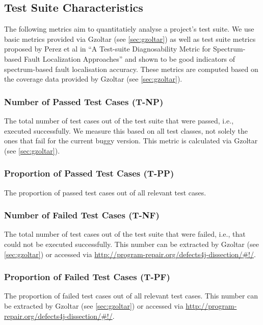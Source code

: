\subsection{Test Suite Characteristics}

The following metrics aim to quantitatiely analyse a project's test suite. We
use basic metrics provided via Gzoltar (see \ref{sec:gzoltar}) as well as test
suite metrics proposed by Perez et al in \enquote{A Test-suite Diagnosability
Metric for Spectrum-based Fault Localization Approaches} and shown to be good
indicators of spectrum-based fault localisation accuracy. These metrics are
computed based on the coverage data provided by Gzoltar (see \ref{sec:gzoltar}).

\subsubsection{Number of Passed Test Cases (T-NP)}

The total number of test cases out of the test suite that were passed, i.e.,
executed successfully. We measure this based on all test classes, not solely
the ones that fail for the current buggy version. This metric is calculated via
Gzoltar (see \ref{sec:gzoltar}).

\subsubsection{Proportion of Passed Test Cases (T-PP)}

The proportion of passed test cases out of all relevant test cases.

\subsubsection{Number of Failed Test Cases (T-NF)}

The total number of test cases out of the test suite that were failed, i.e.,
that could not be executed successfully. This number can be extracted by Gzoltar
(see \ref{sec:gzoltar}) or accessed via
\url{http://program-repair.org/defects4j-dissection/#!/}.

\subsubsection{Proportion of Failed Test Cases (T-PF)}

The proportion of failed test cases out of all relevant test cases. This number
can be extracted by Gzoltar (see \ref{sec:gzoltar}) or accessed via
\url{http://program-repair.org/defects4j-dissection/#!/}.

